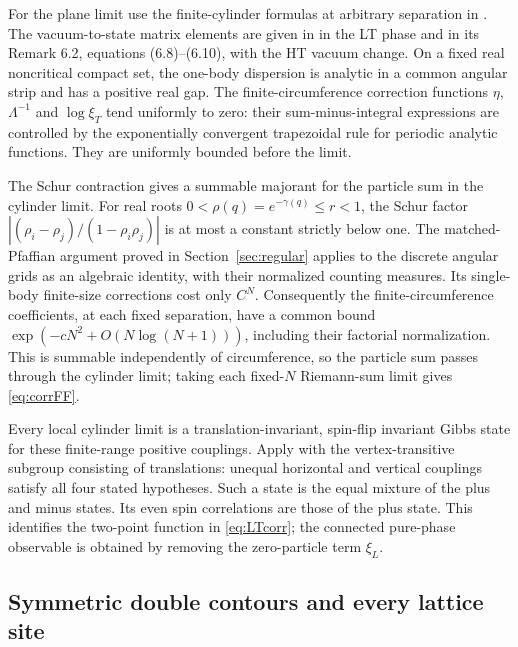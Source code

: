 \documentclass[11pt]{article}
\numberwithin{equation}{section}
\theoremstyle{definition}
\begin{document}
For the plane limit use the finite-cylinder formulas at arbitrary
separation in \cite[(35)--(39)]{BL}. The vacuum-to-state matrix
elements are given in \cite[Theorem 6.1]{IL} in the LT phase and in its
Remark 6.2, equations (6.8)--(6.10), with the HT vacuum change.
On a fixed real noncritical compact set, the one-body dispersion is
analytic in a common angular strip and has a positive real gap. The
finite-circumference correction functions $\eta$, $\Lambda^{-1}$ and
$\log\xi_T$ tend uniformly to zero: their sum-minus-integral expressions
are controlled by the exponentially convergent trapezoidal rule for
periodic analytic functions. They are uniformly bounded before the limit.

The Schur contraction gives a summable majorant for the particle
sum in the cylinder limit. For real roots
$0<\rho(q)=e^{-\gamma(q)}\le r<1$, the Schur factor
$|(\rho_i-\rho_j)/(1-\rho_i\rho_j)|$ is at most a constant strictly below
one. The matched-Pfaffian argument proved in
Section~\ref{sec:regular} applies to the discrete angular grids as an
algebraic identity, with their normalized counting measures. Its
single-body finite-size corrections cost only $C^N$. Consequently the
finite-circumference coefficients, at each fixed separation, have a
common bound $\exp(-cN^2+O(N\log(N+1)))$, including their factorial
normalization. This is summable independently of circumference, so the
particle sum passes through the cylinder limit; taking each fixed-$N$
Riemann-sum limit gives \eqref{eq:corrFF}.

Every local cylinder limit is a translation-invariant, spin-flip invariant
Gibbs state for these finite-range positive couplings. Apply
\cite[Theorem 1]{Raoufi} with the vertex-transitive subgroup consisting
of translations: unequal horizontal and vertical couplings satisfy all
four stated hypotheses. Such a state is the equal mixture of the plus
and minus states. Its even spin correlations are those of the plus
state. This identifies the two-point function in \eqref{eq:LTcorr};
the connected pure-phase observable is obtained by removing the
zero-particle term $\xi_L$.

\subsection{Symmetric double contours and every lattice site}
\end{document}
